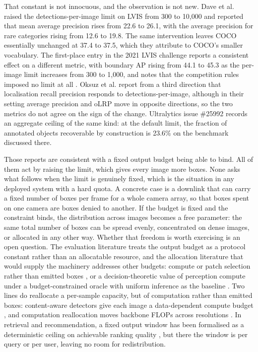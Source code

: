 \documentclass[sn-mathphys,Numbered]{sn-jnl}
\begin{document}
That constant is not innocuous, and the observation is not new. Dave et al. \cite{dave2021devil} raised the detections-per-image limit on LVIS from 300 to 10,000 and reported that mean average precision rises from 22.6 to 26.1, with the average precision for rare categories rising from 12.6 to 19.8. The same intervention leaves COCO essentially unchanged at 37.4 to 37.5, which they attribute to COCO's smaller vocabulary. The first-place entry in the 2021 LVIS challenge reports a consistent effect on a different metric, with boundary AP rising from 44.1 to 45.3 as the per-image limit increases from 300 to 1,000, and notes that the competition rules imposed no limit at all \cite{fu2021lvis}. Oksuz et al. \cite{oksuz2022lrp} report from a third direction that localisation recall precision responds to detections-per-image, although in their setting average precision and oLRP move in opposite directions, so the two metrics do not agree on the sign of the change. Ultralytics issue \#25992 \cite{ultralytics_issue25992} records an aggregate ceiling of the same kind: at the default limit, the fraction of annotated objects recoverable by construction is 23.6\% on the benchmark discussed there.

Those reports are consistent with a fixed output budget being able to bind. All of them act by raising the limit, which gives every image more boxes. None asks what follows when the limit is genuinely fixed, which is the situation in any deployed system with a hard quota. A concrete case is a downlink that can carry a fixed number of boxes per frame for a whole camera array, so that boxes spent on one camera are boxes denied to another. If the budget is fixed and the constraint binds, the distribution across images becomes a free parameter: the same total number of boxes can be spread evenly, concentrated on dense images, or allocated in any other way. Whether that freedom is worth exercising is an open question. The evaluation literature treats the output budget as a protocol constant rather than an allocatable resource, and the allocation literature that would supply the machinery addresses other budgets: compute or patch selection rather than emitted boxes \cite{densescout2026}, or a decision-theoretic value of perception compute under a budget-constrained oracle with uniform inference as the baseline \cite{decisionvalue2026}. Two lines do reallocate a per-sample capacity, but of computation rather than emitted boxes: content-aware detectors give each image a data-dependent compute budget \cite{cadet2020}, and computation reallocation moves backbone FLOPs across resolutions \cite{crnas2020}. In retrieval and recommendation, a fixed output window has been formalised as a deterministic ceiling on achievable ranking quality \cite{wang2026recceiling,buckley2004reliability}, but there the window is per query or per user, leaving no room for redistribution.
\end{document}
